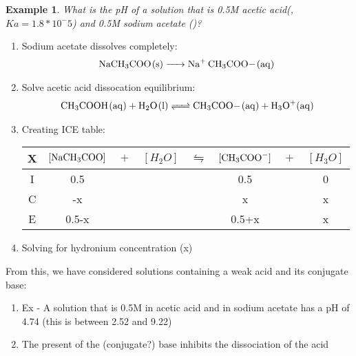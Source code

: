 \documentclass[../CHEM152Notes.tex]{subfiles}
\newtheorem{exmp}{Example}
\begin{document}
\begin{exmp}
    What is the pH of a solution that is 0.5M acetic acid(, $Ka = 1.8*10^-5$) and 0.5M sodium acetate ()?
\end{exmp}
\begin{enumerate}
    \item Sodium acetate dissolves completely:
    \begin{equation*}
        \begin{aligned}
            \ce{NaCH3COO_(s) -> Na+ CH3COO-_(aq)}
        \end{aligned}
    \end{equation*}
    \item Solve acetic acid dissocation equilibrium:
    \begin{equation*}
        \begin{aligned}
            \ce{CH3COOH_(aq) + H2O_(l) <=> CH3COO-_(aq) + H3O+_(aq)}
        \end{aligned}
    \end{equation*}
    \item Creating ICE table: %
    \begin{tabular}{c|c@{}c@{}c@{}c@{}c@{}c@{}c}
        \hline
        X   & $[\ce{NaCH3COO_}]$ & ${}+{}$ & $[H_2O]$ & ${}\leftrightharpoons{}$ & $[\ce{CH3COO-}]$ & ${}+{}$ & $[H_3O]$ \\
        \hline
        I   &  0.5    &&     &&  0.5    && 0  \\
        C   &  -x     &&     &&  x      && x   \\
        E   &  0.5-x  &&     &&  0.5+x  && x  \\      
    \end{tabular}
    \item Solving for hydronium concentration (x)
\end{enumerate}
From this, we have considered solutions containing a weak acid and its conjugate base:
\begin{enumerate}
    \item Ex - A solution that is 0.5M in acetic acid and in sodium acetate has a pH of 4.74 (this is between 2.52 and 9.22)
    \item The present of the (conjugate?) base inhibits the dissociation of the acid
\end{enumerate}
\end{document}
